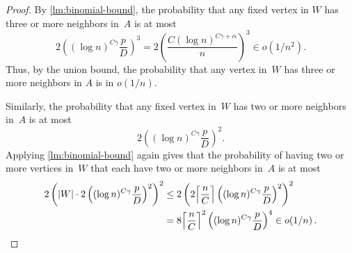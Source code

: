 \documentclass[a4paper,11pt]{article}
\theoremstyle{definition}
\theoremstyle{plain}
\DeclarePairedDelimiter\ceil{\lceil}{\rceil}
\begin{document}
\fewCollisions*
\begin{proof}
	By \cref{lm:binomial-bound}, the probability that any fixed vertex in $W$ has three or more neighbors in~$A$ is at most
	\[
	2 \left((\log n)^{C \gamma} \frac{p}{D}\right)^3
	=
	2\left(\frac{C (\log n)^{C \gamma + \alpha}}{n}\right)^3
	\in o(1/n^2).
	\]
	Thus, by the union bound, the probability that any vertex in~$W$ has three or more neighbors in $A$ is in $o(1/n)$.
	
	Similarly, the probability that any fixed vertex in~$W$ has two or more neighbors in~$A$ is at most
	\[
	2 \left((\log n)^{C \gamma}\frac{p}{D}\right)^2.
	\]
	Applying \cref{lm:binomial-bound} again gives that the probability of having two or more vertices in~$W$ that each have two or more neighbors in~$A$ is at most
	\begin{align*}
	2\left(|W| \cdot 2\left((\log n)^{C \gamma} \frac{p}{D}\right)^2\right)^2 &\leq
	2\left(2 \ceil*{\frac{n}{C}} \left((\log n)^{C \gamma} \frac{p}{D}\right)^2\right)^2
	\\ &= 8 \ceil*{\frac{n}{C}}^2 \left((\log n)^{C\gamma} \frac{p}{D}\right)^4 
	\in o(1/n)\,. \qedhere
	\end{align*}
\end{proof}


\printbibliography
\end{document}
